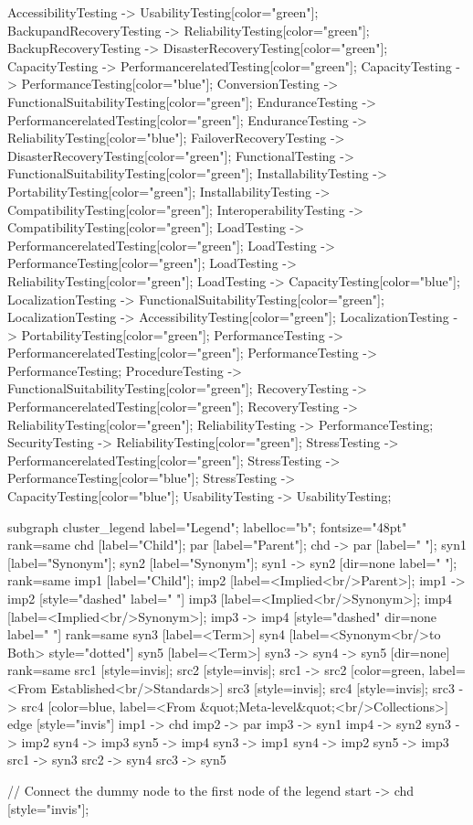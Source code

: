 \documentclass{article}
\begin{document}
{AccessibilityTesting -> UsabilityTesting[color="green"];
BackupandRecoveryTesting -> ReliabilityTesting[color="green"];
BackupRecoveryTesting -> DisasterRecoveryTesting[color="green"];
CapacityTesting -> PerformancerelatedTesting[color="green"];
CapacityTesting -> PerformanceTesting[color="blue"];
ConversionTesting -> FunctionalSuitabilityTesting[color="green"];
EnduranceTesting -> PerformancerelatedTesting[color="green"];
EnduranceTesting -> ReliabilityTesting[color="blue"];
FailoverRecoveryTesting -> DisasterRecoveryTesting[color="green"];
FunctionalTesting -> FunctionalSuitabilityTesting[color="green"];
InstallabilityTesting -> PortabilityTesting[color="green"];
InstallabilityTesting -> CompatibilityTesting[color="green"];
InteroperabilityTesting -> CompatibilityTesting[color="green"];
LoadTesting -> PerformancerelatedTesting[color="green"];
LoadTesting -> PerformanceTesting[color="green"];
LoadTesting -> ReliabilityTesting[color="green"];
LoadTesting -> CapacityTesting[color="blue"];
LocalizationTesting -> FunctionalSuitabilityTesting[color="green"];
LocalizationTesting -> AccessibilityTesting[color="green"];
LocalizationTesting -> PortabilityTesting[color="green"];
PerformanceTesting -> PerformancerelatedTesting[color="green"];
PerformanceTesting -> PerformanceTesting;
ProcedureTesting -> FunctionalSuitabilityTesting[color="green"];
RecoveryTesting -> PerformancerelatedTesting[color="green"];
RecoveryTesting -> ReliabilityTesting[color="green"];
ReliabilityTesting -> PerformanceTesting;
SecurityTesting -> ReliabilityTesting[color="green"];
StressTesting -> PerformancerelatedTesting[color="green"];
StressTesting -> PerformanceTesting[color="blue"];
StressTesting -> CapacityTesting[color="blue"];
UsabilityTesting -> UsabilityTesting;

subgraph cluster_legend {
    label="Legend";
    labelloc="b";
    fontsize="48pt"
    {
        rank=same
        chd [label="Child"];
        par [label="Parent"];
        chd -> par [label="                "];
        syn1 [label="Synonym"];
        syn2 [label="Synonym"];
        syn1 -> syn2 [dir=none label="                "];
    }
    {
        rank=same
        imp1 [label="Child"];
        imp2 [label=<Implied<br/>Parent>];
        imp1 -> imp2 [style="dashed" label="                "]
        imp3 [label=<Implied<br/>Synonym>];
        imp4 [label=<Implied<br/>Synonym>];
        imp3 -> imp4 [style="dashed" dir=none label="                "]
    }
    {
        rank=same
        syn3 [label=<Term>]
        syn4 [label=<Synonym<br/>to Both> style="dotted"]
        syn5 [label=<Term>]
        syn3 -> syn4 -> syn5 [dir=none]
    }
{
rank=same
src1 [style=invis];
src2 [style=invis];
src1 -> src2 [color=green, label=<From Established<br/>Standards>]
src3 [style=invis];
src4 [style=invis];
src3 -> src4 [color=blue, label=<From &quot;Meta-level&quot;<br/>Collections>]
}
    edge [style="invis"]
    imp1 -> chd
    imp2 -> par
    imp3 -> syn1
    imp4 -> syn2
syn3 -> imp2
syn4 -> imp3
syn5 -> imp4
syn3 -> imp1
syn4 -> imp2
syn5 -> imp3
src1 -> syn3
src2 -> syn4
src3 -> syn5
}

// Connect the dummy node to the first node of the legend
start -> chd [style="invis"];
}
\end{document}
